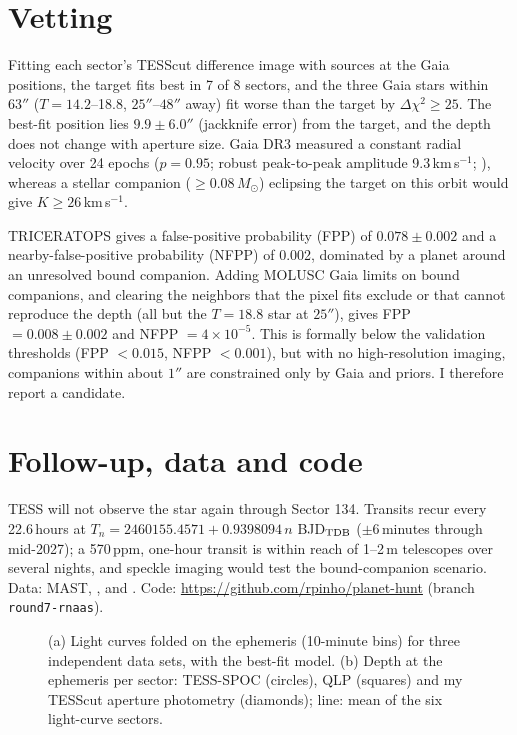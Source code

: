 \documentclass{aastex701}
\begin{document}
\section{Vetting}

Fitting each sector's TESScut difference image with sources at the Gaia positions, the target fits best in 7 of 8 sectors, and the three Gaia stars within $63''$ ($T=14.2$--18.8, $25''$--$48''$ away) fit worse than the target by $\Delta\chi^2\ge25$. The best-fit position lies $9.9\pm6.0''$ (jackknife error) from the target, and the depth does not change with aperture size. Gaia DR3 measured a constant radial velocity over 24 epochs ($p=0.95$; robust peak-to-peak amplitude 9.3\,km\,s$^{-1}$; \citealt{2023A&A...674A...5K}), whereas a stellar companion ($\ge0.08\,M_\odot$) eclipsing the target on this orbit would give $K\ge26$\,km\,s$^{-1}$.

TRICERATOPS \citep{2021AJ....161...24G} gives a false-positive probability (FPP) of $0.078\pm0.002$ and a nearby-false-positive probability (NFPP) of 0.002, dominated by a planet around an unresolved bound companion. Adding MOLUSC \citep{2021AJ....162..128W} Gaia limits on bound companions, and clearing the neighbors that the pixel fits exclude or that cannot reproduce the depth (all but the $T=18.8$ star at $25''$), gives FPP $=0.008\pm0.002$ and NFPP $=4\times10^{-5}$. This is formally below the validation thresholds (FPP $<0.015$, NFPP $<0.001$), but with no high-resolution imaging, companions within about $1''$ are constrained only by Gaia and priors. I therefore report a candidate.

\section{Follow-up, data and code}

TESS will not observe the star again through Sector 134. Transits recur every 22.6\,hours at $T_n=2460155.4571+0.9398094\,n$ BJD$_{\rm TDB}$ ($\pm6$\,minutes through mid-2027); a 570\,ppm, one-hour transit is within reach of 1--2\,m telescopes over several nights, and speckle imaging would test the bound-companion scenario. Data: MAST, ,  and . Code: \url{https://github.com/rpinho/planet-hunt} (branch \texttt{round7-rnaas}).

\begin{figure}[ht!]
\caption{(a) Light curves folded on the ephemeris (10-minute bins) for three independent data sets, with the best-fit model. (b) Depth at the ephemeris per sector: TESS-SPOC (circles), QLP (squares) and my TESScut aperture photometry (diamonds); line: mean of the six light-curve sectors.\label{fig:1}}
\end{figure}
\end{document}
